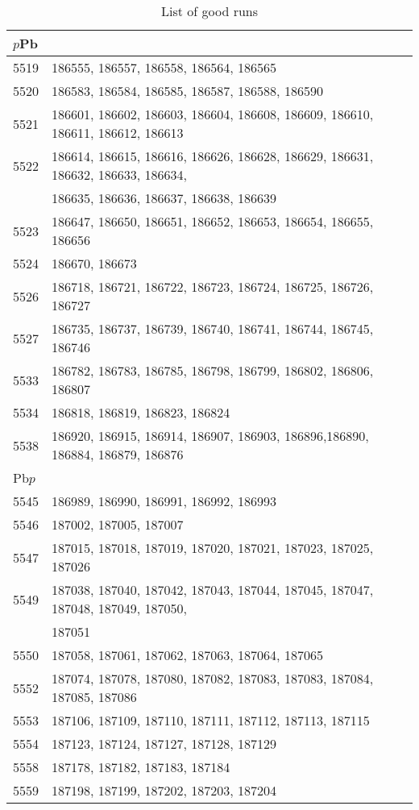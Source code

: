 \begin{table}[!tbp]
\caption{List of good runs}
\begin{center}
\begin{tabular}{ll}
\hline
\multicolumn{2}{l}{$p$Pb}\\
\hline
5519 & 186555, 186557, 186558, 186564, 186565 \\
5520 & 186583, 186584, 186585, 186587, 186588, 186590 \\
5521 & 186601, 186602, 186603, 186604, 186608, 186609, 186610, 186611, 186612, 186613 \\
5522 & 186614, 186615, 186616, 186626, 186628, 186629, 186631, 186632, 186633, 186634, \\
     & 186635, 186636, 186637, 186638, 186639\\
5523 & 186647, 186650, 186651, 186652, 186653, 186654, 186655, 186656 \\
5524 & 186670, 186673 \\
5526 & 186718, 186721, 186722, 186723, 186724, 186725, 186726, 186727 \\
5527 & 186735, 186737, 186739, 186740, 186741, 186744, 186745, 186746 \\
5533 & 186782, 186783, 186785, 186798, 186799, 186802, 186806, 186807 \\
5534 & 186818, 186819, 186823, 186824 \\
5538 & 186920, 186915, 186914, 186907, 186903, 186896,186890, 186884, 186879, 186876 \\
\hline
\multicolumn{2}{l}{Pb$p$}\\
\hline
5545 &  186989, 186990, 186991, 186992, 186993 \\
5546 &  187002, 187005, 187007\\
5547 &  187015, 187018, 187019, 187020, 187021, 187023, 187025, 187026\\
5549 &  187038, 187040, 187042, 187043, 187044, 187045, 187047, 187048, 187049, 187050,\\
     & 187051 \\
5550 &  187058, 187061, 187062, 187063, 187064, 187065\\
5552 &  187074, 187078, 187080, 187082, 187083, 187083, 187084, 187085, 187086\\
5553 &  187106, 187109, 187110, 187111, 187112, 187113, 187115\\
5554 &  187123, 187124, 187127, 187128, 187129\\
5558 &  187178, 187182, 187183, 187184\\
5559 &  187198, 187199, 187202, 187203, 187204\\

\end{tabular}
\end{center}
\end{table}
